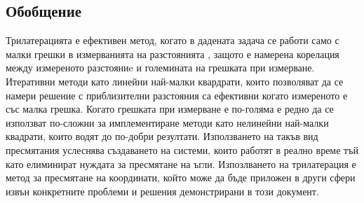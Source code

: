 \subsection{Обобщение}

Трилатерацията е ефективен метод, когато в дадената задача се работи само с малки грешки в измерванията на разстоянията \cite{trilat}, защото е намерена корелация между измереното разстояниe и големината на грешката при измерване. Итеративни методи като линейни най-малки квардрати, които позволяват да се намери решение с приблизителни разстояния са ефективни когато измереното е със малка грешка. Когато грешката при измерване е по-голяма е редно да се използват по-сложни за имплементиране методи като нелинейни най-малки квадрати, които водят до по-добри резултати. Използването на такъв вид пресмятания услеснява създаването на системи, които работят в реално време тъй като елиминират нуждата за пресмятане на ъгли. Изпозлването на трилатерация е метод за пресмятане на координати, който може да бъде приложен в други сфери извън конкретните проблеми и решения демонстрирани в този документ. 